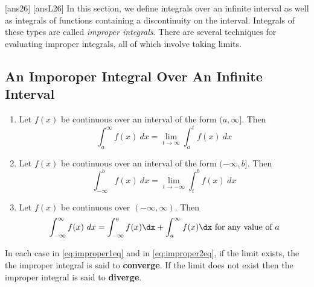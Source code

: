 \newpage
[ans26]
[ansL26]
\noindent In this section, we define integrals over an infinite interval as well as integrals of functions containing a discontinuity on the interval. Integrals of these types are called \emph{improper integrals}. There are several techniques for evaluating improper integrals, all of which involve taking limits.

\subsection*{An Imporoper Integral Over An Infinite Interval}


\begin{tcolorbox}[title = {Definition}]
\begin{enumerate}
    \item Let $f(x)$ be continuous over an interval of the form $(a,\infty]$. Then
    \begin{equation}\label{eq:improper1eq}
        \int_a^{\infty} f(x)\ dx = \lim\limits_{t \to \infty} \int_a^t f(x) \ dx
    \end{equation}
   
    \item Let $f(x)$ be continuous over an interval of the form $(-\infty,b]$. Then
    \begin{equation}\label{eq:improper2eq}
        \int_{-\infty}^{b} f(x)\ dx = \lim\limits_{t \to -\infty} \int_t^b f(x) \ dx
    \end{equation}
    
    \item Let $f(x)$ be continuous over $(-\infty,\infty)$. Then
    \begin{equation}\label{eq:improper3eq}
        \int_{-\infty}^{\infty} f(x) \ dx = \int_{-\infty}^a f(x) \dx + \int_a^{\infty} f(x) \dx \ \text{for any value of} \ a
    \end{equation}
\end{enumerate}
\end{tcolorbox}

\noindent In each case in \ref{eq:improper1eq} and in \ref{eq:improper2eq}, if the limit exists, the the improper integral is said to \textbf{converge}. If the limit does not exist then the improper integral is said to \textbf{diverge}.\\

